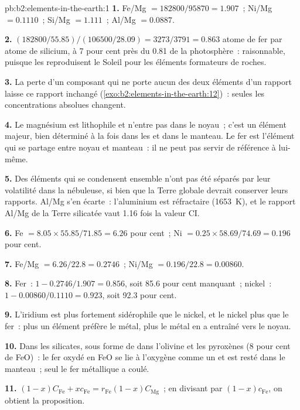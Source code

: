 \begin{solution}{pb:b2:elements-in-the-earth:1}
\textbf{1.} Fe/Mg $= \num{182800}/\num{95870} = 1.907$~; Ni/Mg $= 0.1110$~; Si/Mg $=
1.111$~; Al/Mg $= 0.0887$.

\textbf{2.} $(\num{182800}/55.85)/(\num{106500}/28.09) = 3273/3791 = 0.863$ atome de fer
par atome de silicium, à 7 pour cent près du 0.81 de la photosphère~: raisonnable,
puisque les  reproduisent le Soleil pour les éléments formateurs de roches.

\textbf{3.} La perte d'un composant qui ne porte aucun des deux éléments d'un rapport laisse ce rapport
inchangé (\cref{exo:b2:elements-in-the-earth:12})~: seules les concentrations absolues changent.

\textbf{4.} Le magnésium est lithophile et n'entre pas dans le noyau~; c'est un élément
majeur, bien déterminé à la fois dans les  et dans le manteau. Le fer est l'élément
qui se partage entre noyau et manteau~: il ne peut pas servir de référence à lui-même.

\textbf{5.} Des éléments qui se condensent ensemble n'ont pas été séparés par leur volatilité dans la
nébuleuse, si bien que la Terre globale devrait conserver leurs rapports. Al/Mg s'en écarte~: l'aluminium
est réfractaire (\qty{1653}{K}), et le rapport Al/Mg de la Terre silicatée vaut 1.16 fois la valeur CI.

\textbf{6.} Fe $= 8.05\times55.85/71.85 = 6.26$ pour cent~; Ni $= 0.25\times58.69/74.69 =
0.196$ pour cent.

\textbf{7.} Fe/Mg $= 6.26/22.8 = 0.2746$~; Ni/Mg $= 0.196/22.8 = 0.00860$.

\textbf{8.} Fer~: $1 - 0.2746/1.907 = 0.856$, soit 85.6 pour cent
manquant~; nickel~: $1 - 0.00860/0.1110 = 0.923$, soit 92.3 pour cent.

\textbf{9.} L'iridium est plus fortement sidérophile que le nickel, et le nickel plus que
le fer~: plus un élément préfère le métal, plus le métal en a entraîné vers le noyau.

\textbf{10.} Dans les silicates, sous forme de  dans l'olivine et les
pyroxènes (8 pour cent de FeO)~: le fer oxydé en FeO se lie à l'oxygène comme un
 et est resté dans le manteau~; seul le fer métallique a coulé.

\textbf{11.} $(1-x)C_{\mathrm{Fe}} + xc_{\mathrm{Fe}} = r_{\mathrm{Fe}}(1-x)C_{\mathrm{Mg}}$~;
en divisant par $(1-x)c_{\mathrm{Fe}}$, on obtient la proposition.


\end{solution}
